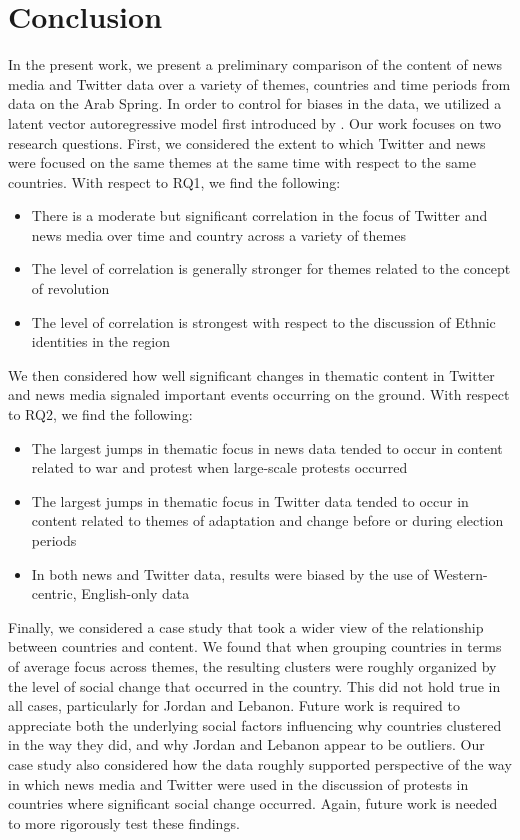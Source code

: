 \section{Conclusion}

In the present work, we present a preliminary comparison of the content of news media and Twitter data over a variety of themes, countries and time periods from data on the Arab Spring. In order to control for biases in the data, we utilized a latent vector autoregressive model first introduced by \cite{eisenstein_diffusion_2014}. Our work focuses on two research questions. First, we considered the extent to which Twitter and news were focused on the same themes at the same time with respect to the same countries. With respect to RQ1, we find the following: 
\begin{itemize}
	\item There is a moderate but significant correlation in the focus of Twitter and news media over time and country across a variety of themes
	\item The level of correlation is generally stronger for themes related to the concept of revolution
	\item The level of correlation is strongest with respect to the discussion of Ethnic identities in the region
\end{itemize}

We then considered how well significant changes in thematic content in Twitter and news media signaled important events occurring on the ground. With respect to RQ2, we find the following: 
\begin{itemize}
	\item The largest jumps in thematic focus in news data tended to occur in content related to war and protest when large-scale protests occurred
	\item The largest jumps in thematic focus in Twitter data tended to occur in content related to themes of adaptation and change before or during election periods
	\item In both news and Twitter data, results were biased by the use of Western-centric, English-only data
\end{itemize}

Finally, we considered a case study that took a wider view of the relationship between countries and content. We found that when grouping countries in terms of average focus across themes, the resulting clusters were roughly organized by the level of social change that occurred in the country. This did not hold true in all cases, particularly for Jordan and Lebanon. Future work is required to appreciate both the underlying social factors influencing why countries clustered in the way they did, and why Jordan and Lebanon appear to be outliers. Our case study also considered how the data roughly supported   perspective of the way in which news media and Twitter were used in the discussion of protests in countries where significant social change occurred.  Again, future work is needed to more rigorously test these findings.

